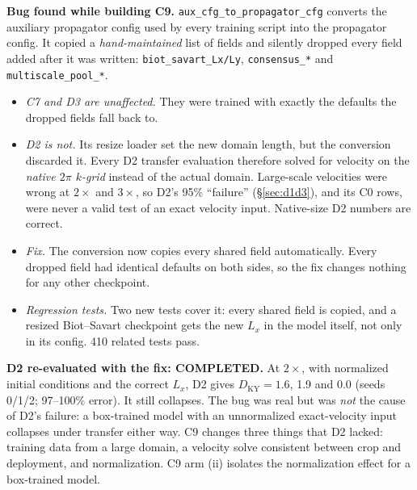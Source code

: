 \documentclass[11pt]{article}
\begin{document}
\textbf{Bug found while building C9.} \texttt{aux\_cfg\_to\_propagator\_cfg}
converts the auxiliary propagator config used by every training script
into the propagator config. It copied a \emph{hand-maintained} list of
fields and silently dropped every field added after it was written:
\texttt{biot\_savart\_Lx/Ly}, \texttt{consensus\_*} and
\texttt{multiscale\_pool\_*}.
\begin{itemize}[leftmargin=*]
\item \emph{C7 and D3 are unaffected.} They were trained with exactly the
  defaults the dropped fields fall back to.
\item \emph{D2 is not.} Its resize loader set the new domain length, but
  the conversion discarded it. Every D2 transfer evaluation therefore
  solved for velocity on the \emph{native $2\pi$ $k$-grid} instead of the
  actual domain. Large-scale velocities were wrong at $2\times$ and
  $3\times$, so D2's 95\% ``failure'' (\S\ref{sec:d1d3}), and its C0
  rows, were never a valid test of an exact velocity input. Native-size
  D2 numbers are correct.
\item \emph{Fix.} The conversion now copies every shared field
  automatically. Every dropped field had identical defaults on both
  sides, so the fix changes nothing for any other checkpoint.
\item \emph{Regression tests.} Two new tests cover it: every shared field
  is copied, and a resized Biot--Savart checkpoint gets the new $L_x$ in
  the model itself, not only in its config. 410 related tests pass.
\end{itemize}
\textbf{D2 re-evaluated with the fix: COMPLETED.} At $2\times$, with
normalized initial conditions and the correct $L_x$, D2 gives
$D_{\mathrm{KY}}=1.6$, 1.9 and 0.0 (seeds 0/1/2; 97--100\% error). It
still collapses. The bug was real but was \emph{not} the cause of D2's
failure: a box-trained model with an unnormalized exact-velocity input
collapses under transfer either way. C9 changes three things that D2
lacked: training data from a large domain, a velocity solve consistent
between crop and deployment, and normalization. C9 arm (ii) isolates the
normalization effect for a box-trained model.
\end{document}
